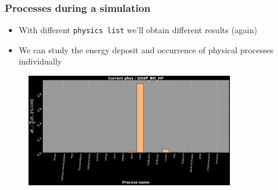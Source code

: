 \begin{frame}
\frametitle{Processes during a simulation}

\begin{block}{}
	\begin{itemize}
		\item With different \texttt{physics list} we'll obtain different results (again)
		\item We can study the energy deposit and occurrence of physical processes individually
	\end{itemize}
\end{block}

\begin{figure}
	\includegraphics[width=0.8\textwidth]{images/process_dist_weighted_E100_phQGSP_BIC_HP.png}
\end{figure}

\end{frame}